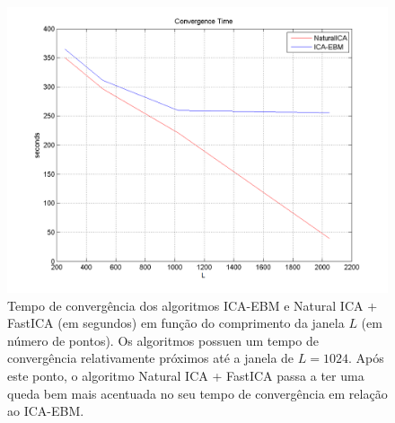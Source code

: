 \begin{figure}
    \centering
        \includegraphics[scale=0.8]{figuras/comparison_convergence_window.png}
            \caption{Tempo de convergência dos algoritmos ICA-EBM e Natural ICA + FastICA (em segundos) em função do comprimento da janela $L$ (em número de pontos). Os algoritmos possuen um tempo de convergência relativamente próximos até a janela de $L=1024$. Após este ponto, o algoritmo Natural ICA + FastICA passa a ter uma queda bem mais acentuada no seu tempo de convergência em relação ao ICA-EBM.}
    \label{fig:comparison_convergence_window}
\end{figure}
